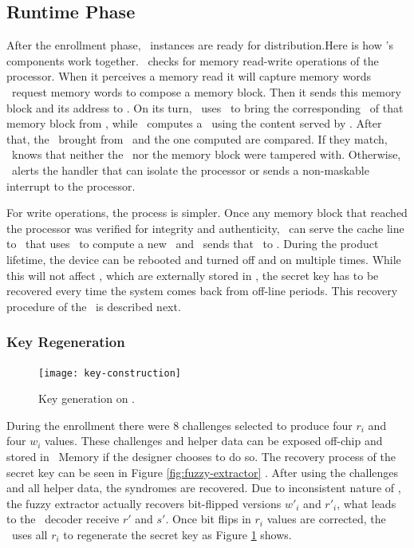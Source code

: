 \subsection{Runtime Phase}
\label{subsec:runtimephase}
\def\fenroll{Figure \ref{fig:fuzzy-extractor} \subref{fig:fuzzy-enroll}}
\def\fregen{Figure \ref{fig:fuzzy-extractor} \subref{fig:fuzzy-regen}}
After the enrollment phase, \cshia~instances are ready for distribution.Here is how \cshia's components work together. \handler~checks for memory read-write operations of the processor. When it perceives a memory read it will capture memory words \andor~request memory words to compose a memory block. Then it sends this memory block and its address to \seceng. On its turn, \seceng~uses \pmmu~to bring the corresponding \ptag~of that memory block from \ptagmem, while \ptaggen~computes a \ptag~using the content served by \handler. After that, the \ptag~brought from \ptagmem~and the one computed are compared. If they match, \seceng~knows that neither the \ptag~nor the memory block were tampered with. Otherwise, \seceng~alerts the handler that can isolate the processor or sends a non-maskable interrupt to the processor.


For write operations, the process is simpler. Once any memory block that reached the processor was verified for integrity and authenticity, \handler~can serve the cache line to \seceng~that uses \ptaggen~to compute a new \ptag~and \pmmu~sends that \ptag~to \ptagmem.  During the product lifetime, the device can be rebooted and turned off and on multiple times. While this will not affect \ptags, which are externally stored in \ptagmem, the secret key has to be recovered every time the system comes back from off-line periods. This recovery procedure of the \fuzzy~is described next.

\subsubsection{Key Regeneration}
\label{subsubsec:Key-Regenation}
\begin{figure}[!t]
	\centering
	\texttt{[image: key-construction]}
	\caption{Key generation on \cshia.}
	\label{fig:key-construction}
\end{figure}

During the enrollment there were 8 challenges selected to produce four $r_i$ and four $w_i$ values. These challenges and helper data can be exposed off-chip and stored in \ptag~Memory if the designer chooses to do so. The recovery process of the secret key can be seen in \fregen. After using the challenges and all helper data, the syndromes are recovered. Due to inconsistent nature of \pufs, the fuzzy extractor actually recovers bit-flipped versions $w'_i$ and $r'_i$, what leads to the \bch~decoder receive $r'$ and $s'$. Once bit flips in $r_i$ values are corrected, the \fe~uses all $r_i$ to regenerate the secret key as Figure \ref{fig:key-construction} shows.

